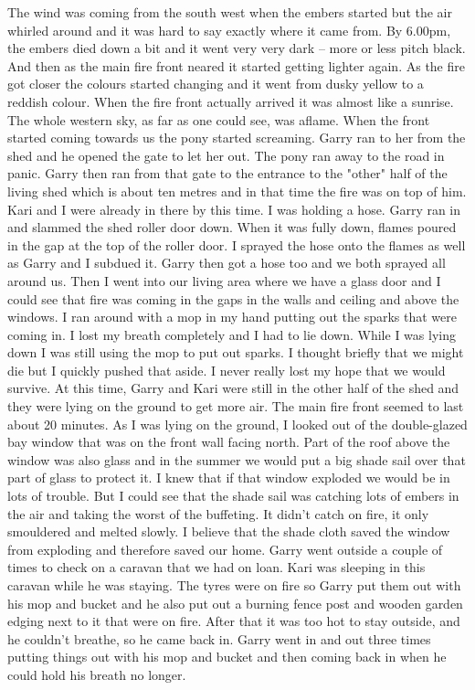 \documentclass[a4paper]{article}
\begin{document}
        The wind was coming from the south west when the embers started but the air whirled around and it was hard to say exactly where it came from. By 6.00pm, the embers died down a bit and it went very very dark – more or less pitch black. And then as the main fire front neared it started getting lighter again. As the fire got closer the colours started changing and it went from dusky yellow to a reddish colour. When the fire front actually arrived it was almost like a sunrise. The whole western sky, as far as one could see, was aflame.
        When the front started coming towards us the pony started screaming. Garry ran to her from the shed and he opened the gate to let her out. The pony ran away to the road in panic.
        Garry then ran from that gate to the entrance to the "other" half of the living shed which is about ten metres and in that time the fire was on top of him. Kari and I were already in there by this time. I was holding a hose. Garry ran in and slammed the shed roller door down. When it was fully down, flames poured in the gap at the top of the roller door. I sprayed the hose onto the flames as well as Garry and I subdued it.
        Garry then got a hose too and we both sprayed all around us. Then I went into our living area where we have a glass door and I could see that fire was coming in the gaps in the walls and ceiling and above the windows. I ran around with a mop in my hand putting out the sparks that were coming in. I lost my breath completely and I had to lie down. While I was lying down I was still using the mop to put out sparks. I thought briefly that we might die but I quickly pushed that aside. I never really lost my hope that we would survive.
        At this time, Garry and Kari were still in the other half of the shed and they were lying on the ground to get more air. The main fire front seemed to last about 20 minutes.
        As I was lying on the ground, I looked out of the double-glazed bay window that was on the front wall facing north. Part of the roof above the window was also glass and in the summer we would put a big shade sail over that part of glass to protect it. I knew that if that window exploded we would be in lots of trouble. But I could see that the shade sail was catching lots of embers in the air and taking the worst of the buffeting. It didn't catch on fire, it only smouldered and melted slowly. I believe that the shade cloth saved the window from exploding and therefore saved our home.
        Garry went outside a couple of times to check on a caravan that we had on loan. Kari was sleeping in this caravan while he was staying. The tyres were on fire so Garry put them out with his mop and bucket and he also put out a burning fence post and wooden garden edging next to it that were on fire. After that it was too hot to stay outside, and he couldn't breathe, so he came back in. Garry went in and out three times putting things out with his mop and bucket and then coming back in when he could hold his breath no longer.
\end{document}
